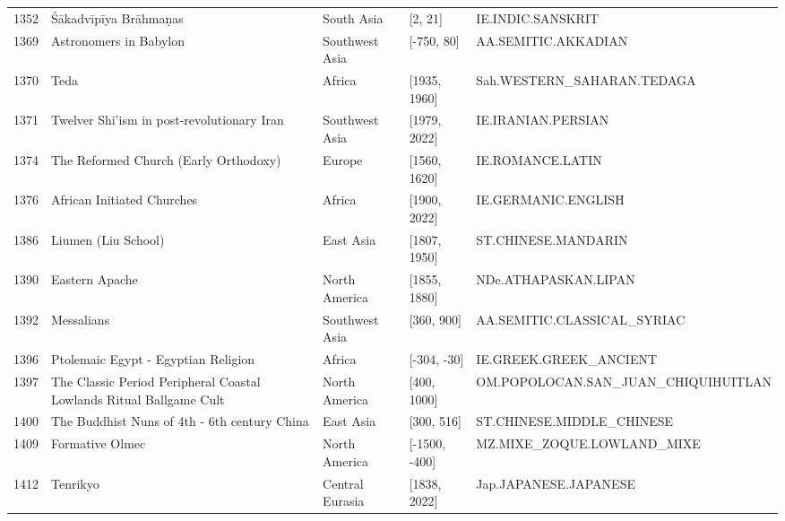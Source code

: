 {\begin{longtable}{rp{3.5cm}llp{3.5cm}}
1352 & {\raggedright Śākadvīpīya Brāhmaṇas} & South Asia & [2, 21] & {\raggedright IE.\allowbreak{}INDIC.\allowbreak{}SANSKRIT} \\
1369 & {\raggedright Astronomers in Babylon} & Southwest Asia & [-750, 80] & {\raggedright AA.\allowbreak{}SEMITIC.\allowbreak{}AKKADIAN} \\
1370 & {\raggedright Teda} & Africa & [1935, 1960] & {\raggedright Sah.\allowbreak{}WESTERN\_\allowbreak{}SAHARAN.\allowbreak{}TEDAGA} \\
1371 & {\raggedright Twelver Shi'ism in post-revolutionary Iran} & Southwest Asia & [1979, 2022] & {\raggedright IE.\allowbreak{}IRANIAN.\allowbreak{}PERSIAN} \\
1374 & {\raggedright The Reformed Church (Early Orthodoxy)} & Europe & [1560, 1620] & {\raggedright IE.\allowbreak{}ROMANCE.\allowbreak{}LATIN} \\
1376 & {\raggedright African Initiated Churches} & Africa & [1900, 2022] & {\raggedright IE.\allowbreak{}GERMANIC.\allowbreak{}ENGLISH} \\
1386 & {\raggedright Liumen (Liu School)} & East Asia & [1807, 1950] & {\raggedright ST.\allowbreak{}CHINESE.\allowbreak{}MANDARIN} \\
1390 & {\raggedright Eastern Apache} & North America & [1855, 1880] & {\raggedright NDe.\allowbreak{}ATHAPASKAN.\allowbreak{}LIPAN} \\
1392 & {\raggedright Messalians} & Southwest Asia & [360, 900] & {\raggedright AA.\allowbreak{}SEMITIC.\allowbreak{}CLASSICAL\_\allowbreak{}SYRIAC} \\
1396 & {\raggedright Ptolemaic Egypt - Egyptian Religion} & Africa & [-304, -30] & {\raggedright IE.\allowbreak{}GREEK.\allowbreak{}GREEK\_\allowbreak{}ANCIENT} \\
1397 & {\raggedright The Classic Period Peripheral Coastal Lowlands Ritual Ballgame Cult} & North America & [400, 1000] & {\raggedright OM.\allowbreak{}POPOLOCAN.\allowbreak{}SAN\_\allowbreak{}JUAN\_\allowbreak{}CHIQUIHUITLAN} \\
1400 & {\raggedright The Buddhist Nuns of 4th - 6th century China} & East Asia & [300, 516] & {\raggedright ST.\allowbreak{}CHINESE.\allowbreak{}MIDDLE\_\allowbreak{}CHINESE} \\
1409 & {\raggedright Formative Olmec} & North America & [-1500, -400] & {\raggedright MZ.\allowbreak{}MIXE\_\allowbreak{}ZOQUE.\allowbreak{}LOWLAND\_\allowbreak{}MIXE} \\
1412 & {\raggedright Tenrikyo} & Central Eurasia & [1838, 2022] & {\raggedright Jap.\allowbreak{}JAPANESE.\allowbreak{}JAPANESE} \\

\end{longtable}}
